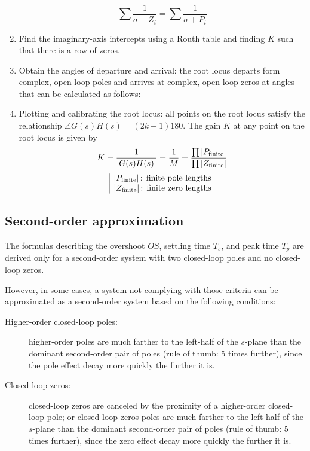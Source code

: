 \documentclass[10pt, twocolumn]{article}
\begin{document}
\begin{enumerate}
\begin{olditemize}
\[            \sum{\frac{1}{\sigma + Z_i}} = \sum{\frac{1}{\sigma + P_i}}
          \]
        \end{olditemize}
  \item Find the imaginary-axis intercepts using a Routh table and finding \(K\) such that there is a row of zeros.
  \item Obtain the angles of departure and arrival: the root locus departs form complex, open-loop poles and arrives at complex, open-loop zeros at angles that can be calculated as follows:
  \item Plotting and calibrating the root locus: all points on the root locus satisfy the relationship  \(\angle G(s)H(s) = (2k + 1)180\).
        The gain \(K\) at any point on the root locus is given by
        \[
          K = \frac{1}{\left| G(s)H(s) \right|} = \frac{1}{M} = \frac{\prod{\left| P_\mathrm{finite} \right|}}{\prod{\left| Z_\mathrm{finite} \right|}}
        \]
        \[
          \begin{array}{|l}
            \left| P_\mathrm{finite} \right| \text{: finite pole lengths} \\
            \left| Z_\mathrm{finite} \right| \text{: finite zero lengths}
          \end{array}
        \]
\end{enumerate}

\subsection{Second-order approximation}
The formulas describing the overshoot \(OS\), settling time \(T_s\), and peak time \(T_p\) are derived only for a second-order system with two closed-loop poles and no closed-loop zeros.

However, in some cases, a system not complying with those criteria can be approximated as a second-order system based on the following conditions:
\begin{description}
  \item[Higher-order closed-loop poles:] higher-order poles are much farther to the left-half of the \(s\)-plane than the dominant second-order pair of poles (rule of thumb: 5 times further), since the pole effect decay more quickly the further it is.
  \item[Closed-loop zeros:] closed-loop zeros are canceled by the proximity of a higher-order closed-loop pole; or closed-loop zeros poles are much farther to the left-half of the \(s\)-plane than the dominant second-order pair of poles (rule of thumb: 5 times further), since the zero effect decay more quickly the further it is.
\end{description}
\end{document}
